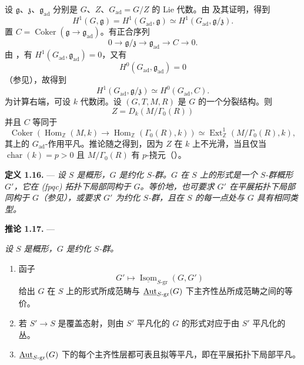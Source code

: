 设 \(\mathfrak g\)、\(\mathfrak z\)、\(\mathfrak g_{\mathrm{ad}}\) 分别是 \(G\)、\(Z\)、\(G_{\mathrm{ad}}=G/Z\) 的 Lie 代数。由  及其证明，得到
\[
  H^1(G,\mathfrak g)
  =
  H^1(G_{\mathrm{ad}},\mathfrak g)
  \simeq
  H^1(G_{\mathrm{ad}},\mathfrak g/\mathfrak z).
\]
置 \(C=\operatorname{Coker}(\mathfrak g\to\mathfrak g_{\mathrm{ad}})\)。有正合序列
\[
  0\longrightarrow\mathfrak g/\mathfrak z
  \longrightarrow\mathfrak g_{\mathrm{ad}}
  \longrightarrow C\longrightarrow0.
\]
由 ，有 \(H^1(G_{\mathrm{ad}},\mathfrak g_{\mathrm{ad}})=0\)，又有
\[
  H^0(G_{\mathrm{ad}},\mathfrak g_{\mathrm{ad}})=0
\]
（参见），故得到
\[
  H^1(G_{\mathrm{ad}},\mathfrak g/\mathfrak z)
  \simeq H^0(G_{\mathrm{ad}},C).
\]
为计算右端，可设 \(k\) 代数闭。设 \((G,T,M,R)\) 是 \(G\) 的一个分裂结构。则
\[
  Z=D_k(M/\Gamma_0(R))
\]
并且 \(C\) 等同于
\[
  \operatorname{Coker}\!\left(
    \operatorname{Hom}_{\mathbb Z}(M,k)
    \longrightarrow
    \operatorname{Hom}_{\mathbb Z}(\Gamma_0(R),k)
  \right)
  \simeq
  \operatorname{Ext}^1_{\mathbb Z}(M/\Gamma_0(R),k),
\]
其上的 \(G_{\mathrm{ad}}\)-作用平凡。推论随之得到，因为 \(Z\) 在 \(k\) 上不光滑，当且仅当 \(\operatorname{char}(k)=p>0\) 且 \(M/\Gamma_0(R)\) 有 \(p\)-挠元（）。

\medskip\noindent\textbf{定义 1.16.} ---
{\itshape 设 \(S\) 是概形，\(G\) 是约化 \(S\)-群。\emph{\(G\) 在 \(S\) 上的形式}是一个 \(S\)-群概形 \(G'\)，它在 \textup{(fpqc)} 拓扑下局部同构于 \(G\)。等价地，也可要求 \(G'\) 在平展拓扑下局部同构于 \(G\)（参见），或要求 \(G'\) 为约化 \(S\)-群，且在 \(S\) 的每一点处与 \(G\) 具有相同类型。}

\medskip\noindent\textbf{推论 1.17.} ---
{\itshape 设 \(S\) 是概形，\(G\) 是约化 \(S\)-群。
\begin{enumerate}
\item[(i)] 函子
\[
  G'\longmapsto
  \underline{\operatorname{Isom}}_{S\text{-}\mathrm{gr}}(G,G')
\]
给出 \(G\) 在 \(S\) 上的形式所成范畴与 \(\underline{\operatorname{Aut}}_{S\text{-}\mathrm{gr}}(G)\) 下主齐性丛所成范畴之间的等价。
\item[(ii)] 若 \(S'\to S\) 是覆盖态射，则由 \(S'\) 平凡化的 \(G\) 的形式对应于由 \(S'\) 平凡化的丛。
\item[\SGAInlineRefTarget{sga3:xxiv:1.17:item:iii}(iii)] \(\underline{\operatorname{Aut}}_{S\text{-}\mathrm{gr}}(G)\) 下的每个主齐性层都可表且拟等平凡，即在平展拓扑下局部平凡。
\end{enumerate}}

